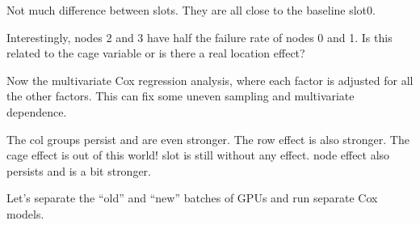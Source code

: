 Not much difference between slots. They are all close to the baseline
slot0.

Interestingly, nodes 2 and 3 have half the failure rate of nodes 0 and
1. Is this related to the cage variable or is there a real location
effect?

Now the multivariate Cox regression analysis, where each factor is
adjusted for all the other factors. This can fix some uneven sampling
and multivariate dependence. 

The col groups persist and are even stronger. The row effect is also
stronger. The cage effect is out of this world! slot is still without
any effect. node effect also persists and is a bit stronger. 

Let’s separate the “old” and “new” batches of GPUs and run separate
Cox models. 
